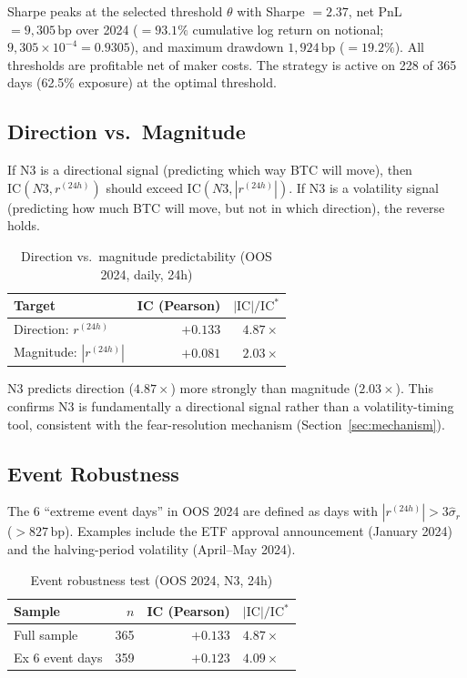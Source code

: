 \documentclass[12pt, a4paper]{article}
\theoremstyle{plain}
\theoremstyle{definition}
\newcommand{\IC}{\mathrm{IC}}
\newcommand{\bp}{\,\mathrm{bp}}
\begin{document}
Sharpe peaks at the selected threshold $\theta$ with Sharpe $= 2.37$, net PnL
$= 9{,}305\bp$ over 2024 ($= 93.1\%$ cumulative log return on notional;
$9{,}305 \times 10^{-4} = 0.9305$),
and maximum drawdown $1{,}924\bp$ ($= 19.2\%$). All thresholds are profitable net
of maker costs. The strategy is active on 228 of 365 days (62.5\% exposure)
at the optimal threshold.

\subsection{Direction vs.\ Magnitude}

If N3 is a directional signal (predicting which way BTC will move), then
$\IC(N3, r^{(24h)})$ should exceed $\IC(N3, |r^{(24h)}|)$. If N3 is
a volatility signal (predicting how much BTC will move, but not in which
direction), the reverse holds.

\begin{table}[H]
\centering
\caption{Direction vs.\ magnitude predictability (OOS 2024, daily, 24h)}
\label{tab:dir_mag}
\begin{tabular}{lrr}
\toprule
Target & IC (Pearson) & $|\IC|/\IC^*$ \\
\midrule
Direction: $r^{(24h)}$ & $+0.133$ & $4.87\times$ \\
Magnitude: $|r^{(24h)}|$ & $+0.081$ & $2.03\times$ \\
\bottomrule
\end{tabular}
\end{table}

N3 predicts direction ($4.87\times$) more strongly than magnitude ($2.03\times$).
This confirms N3 is fundamentally a directional signal rather than a
volatility-timing tool, consistent with the fear-resolution mechanism
(Section~\ref{sec:mechanism}).

\subsection{Event Robustness}

The 6 ``extreme event days'' in OOS 2024 are defined as days with
$|r^{(24h)}| > 3\hat{\sigma}_r$ ($> 827\bp$). Examples include the ETF
approval announcement (January 2024) and the halving-period volatility
(April--May 2024).

\begin{table}[H]
\centering
\caption{Event robustness test (OOS 2024, N3, 24h)}
\label{tab:events}
\begin{tabular}{lrrl}
\toprule
Sample & $n$ & IC (Pearson) & $|\IC|/\IC^*$ \\
\midrule
Full sample & 365 & $+0.133$ & $4.87\times$ \\
Ex 6 event days & 359 & $+0.123$ & $4.09\times$ \\
\bottomrule
\end{tabular}
\end{table}
\end{document}
